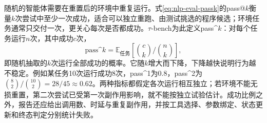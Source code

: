 随机的智能体需要在重置后的环境中重复运行。式\eqref{eq:nlp-eval-passk}的pass@$k$衡量$k$次尝试中至少一次成功，适合可以独立重跑、由测试挑选的程序候选；环境任务通常只交付一次，更关心每次是否都成功。$\tau$-bench为此定义pass\textasciicircum{}$k$：对每个任务运行$n$次，其中成功$c$次，
\begin{equation}
 \text{pass\textasciicircum{}}k=\mathbb{E}_{\text{任务}}\left[\binom{c}{k}\Big/\binom{n}{k}\right],
 \label{eq:nlp-execution-pass-hat-k}
\end{equation}
即随机抽取的$k$次运行全部成功的概率。它随$k$增大而下降，下降越快说明行为越不稳定。例如某任务10次运行成功8次，pass\textasciicircum{}1为0.8，pass\textasciicircum{}2为$\binom{8}{2}/\binom{10}{2}=28/45\approx0.62$。两种指标都假定各次运行相互独立；若环境不能无损重置，第二次尝试已受第一次副作用影响，就不能按独立试验估计。成功比例之外，报告还应给出调用数、时延与重复副作用，并按工具选择、参数绑定、状态更新和终态判定分别统计失败。
